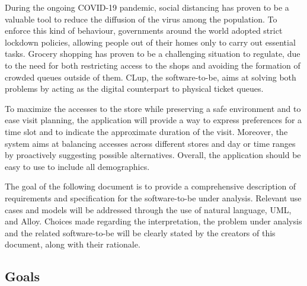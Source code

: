 \documentclass[../../main.tex]{subfiles}
\begin{document}
During the ongoing COVID-19 pandemic, social distancing has proven to be a valuable tool to reduce the diffusion of the virus among the population. To enforce this kind of behaviour,
governments around the world adopted strict lockdown policies, allowing people out of their homes only to carry out essential tasks.
Grocery shopping has proven to be a challenging situation to regulate, due to the need for both restricting access to the shops and 
avoiding the formation of crowded queues outside of them. CLup, the software-to-be, aims at solving both problems by acting as the digital counterpart to physical ticket queues. 

To maximize the accesses to the store while preserving a safe environment and to ease visit planning, the application will provide a way to express preferences for a time slot 
and to indicate the approximate duration of the visit.
Moreover, the system aims at balancing accesses across different stores and day or time ranges by proactively suggesting possible alternatives.
Overall, the application should be easy to use to include all demographics.

The goal of the following document is to provide a comprehensive description of requirements and specification for the software-to-be under analysis. 
Relevant use cases and models will be addressed through the use of natural language, UML, and Alloy. 
Choices made regarding the interpretation, the problem under analysis and the related software-to-be will be clearly stated by the creators of this document, along with their rationale.

\subsection{Goals}

\end{document}
